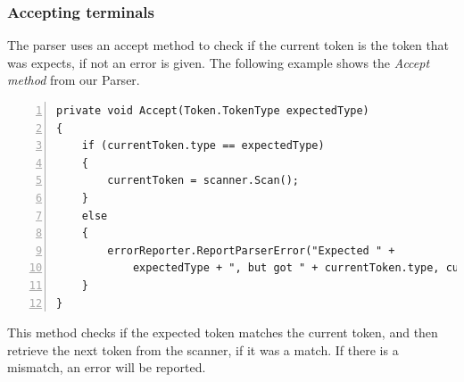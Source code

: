 		\subsubsection{Accepting terminals}
			The parser uses an accept method to check if the current token is the token that was expects, if not an error is given.
			The following example shows the {\it Accept method} from our Parser.
			\begin{lstlisting}[basicstyle=\small\sffamily,
					keywords={break,case,const,continue,default,else,enum,
					for,if,return,switch,while,do,long,void,int,float,double,
					char,struct,typedef,include,size\_t},
					keywordstyle={\color{blue}},
					comment={[l]{//}}, morecomment={[s]{/*}{*/}}, commentstyle=\itshape,
					columns={[l]flexible}, numbers=left, numberstyle=\tiny,
					frameround=fftt, frame=shadowbox, captionpos=b,
					caption={Accept method for accepting tokens},
					label=impl:accept]
private void Accept(Token.TokenType expectedType)
{
	if (currentToken.type == expectedType)
    {
		currentToken = scanner.Scan();
    }
    else
    {
    	errorReporter.ReportParserError("Expected " + 
    		expectedType + ", but got " + currentToken.type, currentToken);
    }
}
			\end{lstlisting}
			This method checks if the expected token matches the current token, and then retrieve the next token from the scanner, if it was a match.
			If there is a mismatch, an error will be reported.
			
